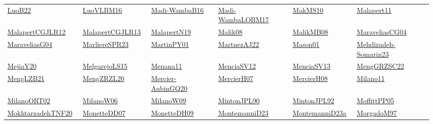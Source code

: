 \begin{longtable}{*{6}{l}}
\href{../works/LuoB22.pdf}{LuoB22}~\cite{LuoB22} & \href{../works/LuoVLBM16.pdf}{LuoVLBM16}~\cite{LuoVLBM16} & \href{../works/Madi-WambaB16.pdf}{Madi-WambaB16}~\cite{Madi-WambaB16} & \href{../works/Madi-WambaLOBM17.pdf}{Madi-WambaLOBM17}~\cite{Madi-WambaLOBM17} & \href{../works/MakMS10.pdf}{MakMS10}~\cite{MakMS10} & \href{../works/Malapert11.pdf}{Malapert11}~\cite{Malapert11}\\ 
\href{../works/MalapertCGJLR12.pdf}{MalapertCGJLR12}~\cite{MalapertCGJLR12} & \href{../works/MalapertCGJLR13.pdf}{MalapertCGJLR13}~\cite{MalapertCGJLR13} & \href{../works/MalapertN19.pdf}{MalapertN19}~\cite{MalapertN19} & \href{../works/Malik08.pdf}{Malik08}~\cite{Malik08} & \href{../works/MalikMB08.pdf}{MalikMB08}~\cite{MalikMB08} & \href{../works/MaraveliasCG04.pdf}{MaraveliasCG04}~\cite{MaraveliasCG04}\\ 
\href{../works/MaraveliasG04.pdf}{MaraveliasG04}~\cite{MaraveliasG04} & \href{../works/MarliereSPR23.pdf}{MarliereSPR23}~\cite{MarliereSPR23} & \href{../works/MartinPY01.pdf}{MartinPY01}~\cite{MartinPY01} & \href{../}{MartnezAJ22}~\cite{MartnezAJ22} & \href{../works/Mason01.pdf}{Mason01}~\cite{Mason01} & \href{../works/Mehdizadeh-Somarin23.pdf}{Mehdizadeh-Somarin23}~\cite{Mehdizadeh-Somarin23}\\ 
\href{../works/MejiaY20.pdf}{MejiaY20}~\cite{MejiaY20} & \href{../works/MelgarejoLS15.pdf}{MelgarejoLS15}~\cite{MelgarejoLS15} & \href{../works/Menana11.pdf}{Menana11}~\cite{Menana11} & \href{../works/MenciaSV12.pdf}{MenciaSV12}~\cite{MenciaSV12} & \href{../works/MenciaSV13.pdf}{MenciaSV13}~\cite{MenciaSV13} & \href{../works/MengGRZSC22.pdf}{MengGRZSC22}~\cite{MengGRZSC22}\\ 
\href{../works/MengLZB21.pdf}{MengLZB21}~\cite{MengLZB21} & \href{../works/MengZRZL20.pdf}{MengZRZL20}~\cite{MengZRZL20} & \href{../works/Mercier-AubinGQ20.pdf}{Mercier-AubinGQ20}~\cite{Mercier-AubinGQ20} & \href{../works/MercierH07.pdf}{MercierH07}~\cite{MercierH07} & \href{../works/MercierH08.pdf}{MercierH08}~\cite{MercierH08} & \href{../}{Milano11}~\cite{Milano11}\\ 
\href{../}{MilanoORT02}~\cite{MilanoORT02} & \href{../works/MilanoW06.pdf}{MilanoW06}~\cite{MilanoW06} & \href{../works/MilanoW09.pdf}{MilanoW09}~\cite{MilanoW09} & \href{../works/MintonJPL90.pdf}{MintonJPL90}~\cite{MintonJPL90} & \href{../}{MintonJPL92}~\cite{MintonJPL92} & \href{../works/MoffittPP05.pdf}{MoffittPP05}~\cite{MoffittPP05}\\ 
\href{../works/MokhtarzadehTNF20.pdf}{MokhtarzadehTNF20}~\cite{MokhtarzadehTNF20} & \href{../works/MonetteDD07.pdf}{MonetteDD07}~\cite{MonetteDD07} & \href{../works/MonetteDH09.pdf}{MonetteDH09}~\cite{MonetteDH09} & \href{../works/MontemanniD23.pdf}{MontemanniD23}~\cite{MontemanniD23} & \href{../works/MontemanniD23a.pdf}{MontemanniD23a}~\cite{MontemanniD23a} & \href{../works/MorgadoM97.pdf}{MorgadoM97}~\cite{MorgadoM97}\\ 

\end{longtable}
